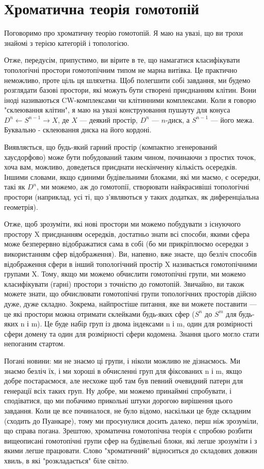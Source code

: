 \section{Хроматична теорія гомотопій}

Поговоримо про хроматичну теорію гомотопій. Я маю на увазі,
що ви трохи знайомі з терією категорій і топологією.

Отже, передусім, припустимо, ви вірите в те, що намагатися
класифікувати топологічні простори гомотопічним типом не марна витівка.
Це практично неможливо, проте ціль ця шляхетна. Щоб полегшити собі завдання,
ми будемо розглядати базові простори, які можуть бути створені приєднанням клітин.
Вони іноді називаються CW-комплексами чи клітинними комплексами. Коли я
говорю "склеювання клітин", я маю на увазі конструювання пушауту для
конуса $D^n \leftarrow S^{n-1} \rightarrow X$, де $X$ --- деякий простір,
$D^n$ --- $n$-диск, а $S^{n-1}$ --- його межа. Буквально - склеювання диска на його кордоні.

Виявляється, що будь-який гарний простір (компактно згенерований хаусдорфово) може
бути побудований таким чином, починаючи з простих точок, хоча вам, можливо,
доведеться приєднати нескінченну кількість осередків. Іншими словами, якщо
єдиними будівельними блоками, які ми маємо, є осередки, такі як $D^n$, ми
можемо, аж до гомотопії, створювати найкрасивіші топологічні простори (наприклад,
усі ті, що з'являються у таких додатках, як диференціальна геометрія).

Отже, щоб зрозуміти, які нові простори ми можемо побудувати з існуючого простору
X приєднанням осередків, достатньо знати всі способи, якими сфера може безперервно
відображатися сама в собі (бо ми прикріплюємо осередки з використанням сфер відображення).
Ви, напевно, вже знаєте, що безліч способів відображення сфери в інший топологічний
простір X називається гомотопічними групами X. Тому, якщо ми можемо обчислити
гомотопічні групи, ми можемо класифікувати (гарні) простори з точністю до гомотопій.
Звичайно, ви також можете знати, що обчислювати гомотопічні групи топологічних
просторів дійсно дуже, дуже складно. Зокрема, найпростіше питання, яке ви можете
поставити --- це які простори можна отримати склейками будь-яких сфер ($S^n$
до $S^m$ для будь-яких n і m). Це буде набір груп із двома індексами n і m,
один для розмірності сфери домену та один для розмірності сфери кодомена.
Знання цього могло стати непоганим стартом.

Погані новини: ми не знаємо ці групи, і ніколи можливо не дізнаємось. Ми знаємо
безліч їх, і ми хороші в обчисленні груп для фіксованих n і m, якщо добре
постараємося, але несхоже щоб там був певний очевидний патерн для генерації
всіх таких груп. Ну добре, ми можемо принаймні спробувати, і сподіватися,
що ми побачимо прикольні штуки дорогою вирішення цього завдання. Коли це
все починалося, не було відомо, наскільки це буде складним (сходить до Пуанкаре),
тому ми просунулися досить далеко, перш ніж зрозуміли, що справа погана. Зрештою,
хроматична гомотопічна теорія є спробою розбити вищеописані гомотопічні групи
сфер на будівельні блоки, які легше зрозуміти і з якими легше працювати.
Слово "хроматичний" відноситься до складових довжин хвиль, в які "розкладається" біле світло.

